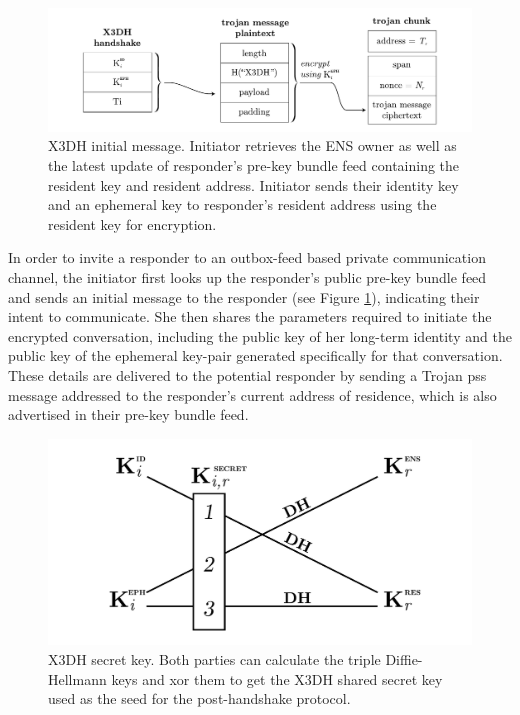 \begin{figure}[htbp]
   \centering
   \includegraphics[width=\textwidth]{fig/x3dh-initial-message.pdf}
   \caption[X3DH initial message \statusgreen]{X3DH initial message. Initiator retrieves the ENS owner as well as the latest update of responder's pre-key bundle feed containing the resident key and resident address. Initiator sends their identity key and an ephemeral key to responder's resident address using the resident key for encryption. }
\label{fig:x3dh-initial-message}
\end{figure}


In order to invite a responder to an outbox-feed based private communication channel, the initiator first looks up the responder's public pre-key bundle feed and sends an initial message to the responder (see Figure \ref{fig:x3dh-initial-message}), indicating their intent to communicate. She then shares the parameters required to initiate the encrypted conversation, including the public key of her long-term identity and the public key of the ephemeral key-pair generated specifically for that conversation. These details are delivered to the potential responder by sending a Trojan pss message addressed to the responder's current address of residence, which is also advertised in their pre-key bundle feed. 

\begin{figure}[htbp]
   \centering
   \includegraphics[width=.6\textwidth]{fig/x3dh.pdf}
   \caption[X3DH secret key \statusgreen]{X3DH secret key. Both parties can calculate the triple Diffie-Hellmann keys and xor them to get the X3DH shared secret key used as the seed for the post-handshake protocol.}
   \label{fig:x3dh}
\end{figure}

